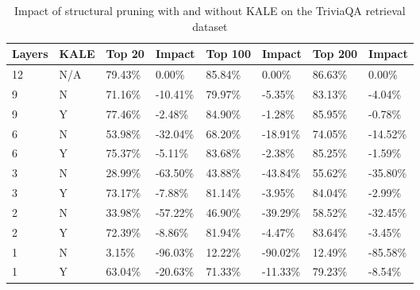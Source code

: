 \begin{table*}[!ht]
    \centering
    \begin{tabular}{|l|l|l|l|l|l|l|l|}
    \hline
        Layers & KALE & Top 20 & Impact & Top 100 & Impact & Top 200 & Impact \\ \hline
        12 & N/A & 79.43\% & 0.00\% & 85.84\% & 0.00\% & 86.63\% & 0.00\% \\ \hline
        9 & N & 71.16\% & -10.41\% & 79.97\% & -5.35\% & 83.13\% & -4.04\% \\ \hline
        9 & Y & 77.46\% & -2.48\% & 84.90\% & -1.28\% & 85.95\% & -0.78\% \\ \hline
        6 & N & 53.98\% & -32.04\% & 68.20\% & -18.91\% & 74.05\% & -14.52\% \\ \hline
        6 & Y & 75.37\% & -5.11\% & 83.68\% & -2.38\% & 85.25\% & -1.59\% \\ \hline
        3 & N & 28.99\% & -63.50\% & 43.88\% & -43.84\% & 55.62\% & -35.80\% \\ \hline
        3 & Y & 73.17\% & -7.88\% & 81.14\% & -3.95\% & 84.04\% & -2.99\% \\ \hline
        2 & N & 33.98\% & -57.22\% & 46.90\% & -39.29\% & 58.52\% & -32.45\% \\ \hline
        2 & Y & 72.39\% & -8.86\% & 81.94\% & -4.47\% & 83.64\% & -3.45\% \\ \hline
        1 & N & 3.15\% & -96.03\% & 12.22\% & -90.02\% & 12.49\% & -85.58\% \\ \hline
        1 & Y & 63.04\% & -20.63\% & 71.33\% & -11.33\% & 79.23\% & -8.54\% \\ \hline
    \end{tabular}
    \caption{Impact of structural pruning with and without KALE on the TriviaQA retrieval dataset}
    \label{tab:kale-trivia}
\end{table*}

